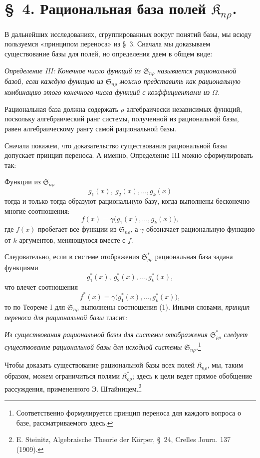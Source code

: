 \documentclass[11pt]{article}
\providecommand{\Kfield}{\mathfrak{K}}
\providecommand{\Ssys}{\mathfrak{S}}
\begin{document}
\section*{\S\ 4. Рациональная база полей $\Kfield_{n\rho}$.}

В дальнейших исследованиях, сгруппированных вокруг понятий базы, мы всюду пользуемся «принципом переноса» из \S\ 3. Сначала мы доказываем существование базы для полей, но определения даем в общем виде:

\emph{Определение III: Конечное число функций из $\Ssys_{n\rho}$ называется рациональной базой, если каждую функцию из $\Ssys_{n\rho}$ можно представить как рациональную комбинацию этого конечного числа функций с коэффициентами из $\Omega$.}

Рациональная база должна содержать $\rho$ алгебраически независимых функций, поскольку алгебраический ранг системы, полученной из рациональной базы, равен алгебраическому рангу самой рациональной базы.

Сначала покажем, что доказательство существования рациональной базы допускает принцип переноса. А именно, Определение III можно сформулировать так:

Функции из $\Ssys_{n\rho}$
\[
  g_1(x),\ g_2(x),\ldots, g_k(x)
\]
тогда и только тогда образуют рациональную базу, когда выполнены бесконечно многие соотношения:
\begin{equation}
  f(x)=\gamma\bigl(g_1(x),\ldots,g_k(x)\bigr),
\tag{1}
\end{equation}
где $f(x)$ пробегает все функции из $\Ssys_{n\rho}$, а $\gamma$ обозначает рациональную функцию от $k$ аргументов, меняющуюся вместе с $f$.

Следовательно, если в системе отображения $\Ssys^*_{\rho\rho}$ рациональная база задана функциями
\[
  g_1^*(x),\ g_2^*(x),\ldots, g_k^*(x),
\]
что влечет соотношения
\[
  f^*(x)=\gamma\bigl(g_1^*(x),\ldots,g_k^*(x)\bigr),
\]
то по Теореме I для $\Ssys_{n\rho}$ выполнены соотношения (1). Иными словами, \emph{принцип переноса для рациональной базы} гласит:

\emph{Из существования рациональной базы для системы отображения $\Ssys^*_{\rho\rho}$ следует существование рациональной базы для исходной системы $\Ssys_{n\rho}$.}\footnote{Соответственно формулируется принцип переноса для каждого вопроса о базе, рассматриваемого здесь.}

Чтобы доказать существование рациональной базы всех полей $\Kfield_{n\rho}$, мы, таким образом, можем ограничиться полями $\Kfield^*_{\rho\rho}$; здесь к цели ведет прямое обобщение рассуждения, примененного Э. Штайницем.\footnote{E. Steinitz, Algebraische Theorie der Körper, \S\ 24, Crelles Journ. 137 (1909).}
\end{document}
